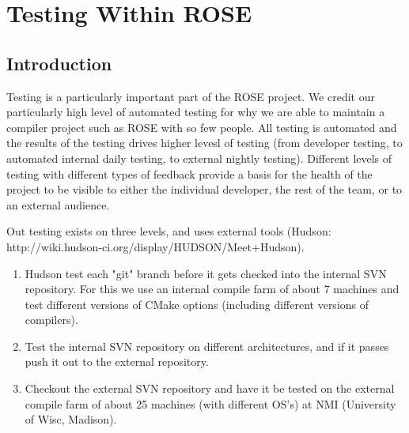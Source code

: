 %
%

\chapter{Testing Within ROSE}
\label{testing::overviewOfTesting}

\section{Introduction}
   Testing is a particularly important part of the ROSE project.
We credit our particularly high level of automated testing for
why we are able to maintain a compiler project such as ROSE
with so few people.  All testing is automated and the results
of the testing drives higher levesl of testing (from
developer testing, to automated internal daily testing, to
external nightly testing).  Different levels of testing
with different types of feedback provide a basis for the health
of the project to be visible to either the individual developer,
the rest of the team, or to an external audience.

   Out testing exists on three levels, and uses external
tools (Hudson: http://wiki.hudson-ci.org/display/HUDSON/Meet+Hudson).
\begin{enumerate}
   \item Hudson test each "git" branch before it gets checked into the internal
     SVN repository. For this we use an internal compile farm of
     about 7 machines and test different versions of CMake options
     (including different versions of compilers).
   \item Test the internal SVN repository on different architectures, and if it passes
     push it out to the external repository.
   \item  Checkout the external SVN repository and have it be tested on the
     external compile farm of about 25 machines (with different OS's) at
     NMI (University of Wisc, Madison).
\end{enumerate}

